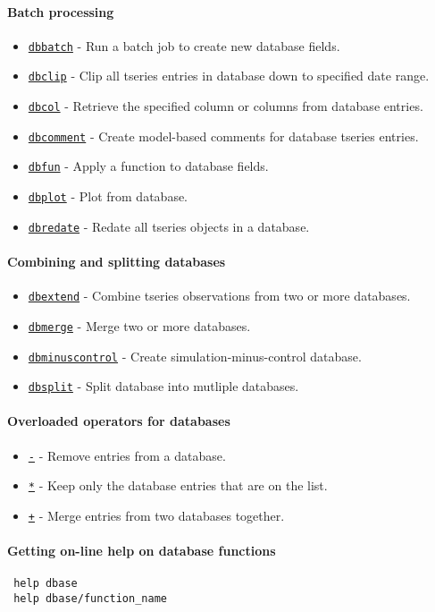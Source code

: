  \paragraph{Batch processing}
 
 \begin{itemize}
 \item
   \href{dbase/dbbatch}{\texttt{dbbatch}} - Run a batch job to create new
   database fields.
 \item
   \href{dbase/dbclip}{\texttt{dbclip}} - Clip all tseries entries in
   database down to specified date range.
 \item
   \href{dbase/dbcol}{\texttt{dbcol}} - Retrieve the specified column or
   columns from database entries.
 \item
   \href{dbase/dbcomment}{\texttt{dbcomment}} - Create model-based
   comments for database tseries entries.
 \item
   \href{dbase/dbfun}{\texttt{dbfun}} - Apply a function to database
   fields.
 \item
   \href{dbase/dbplot}{\texttt{dbplot}} - Plot from database.
 \item
   \href{dbase/dbredate}{\texttt{dbredate}} - Redate all tseries objects
   in a database.
 \end{itemize}
 
 \paragraph{Combining and splitting databases}
 
 \begin{itemize}
 \item
   \href{dbase/dbextend}{\texttt{dbextend}} - Combine tseries
   observations from two or more databases.
 \item
   \href{dbase/dbmerge}{\texttt{dbmerge}} - Merge two or more databases.
 \item
   \href{dbase/dbminuscontrol}{\texttt{dbminuscontrol}} - Create
   simulation-minus-control database.
 \item
   \href{dbase/dbsplit}{\texttt{dbsplit}} - Split database into mutliple
   databases.
 \end{itemize}
 
 \paragraph{Overloaded operators for databases}
 
 \begin{itemize}
 \item
   \href{dbase/dbminus}{\texttt{-}} - Remove entries from a database.
 \item
   \href{dbase/dbmtimes}{\texttt{*}} - Keep only the database entries
   that are on the list.
 \item
   \href{dbase/dbplus}{\texttt{+}} - Merge entries from two databases
   together.
 \end{itemize}
 
 \paragraph{Getting on-line help on database functions}
 
 \begin{verbatim}
 help dbase
 help dbase/function_name
 \end{verbatim}



